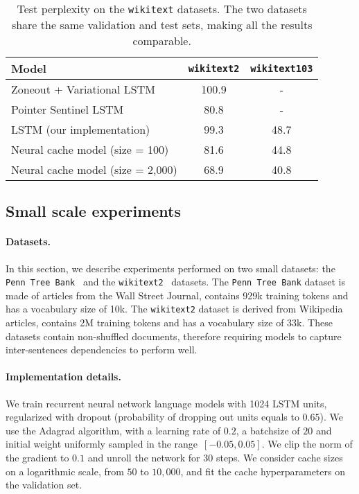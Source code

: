 \documentclass{article} \usepackage{iclr2017_conference,times}
\begin{document}
\begin{table}
  \small
  \centering
  \begin{tabular}{lcc}
    \toprule
    Model & \texttt{wikitext2} & \texttt{wikitext103} \\
    \midrule
    Zoneout + Variational LSTM~\citep{merity2016pointer}  & 100.9 & - \\
    Pointer Sentinel LSTM~\citep{merity2016pointer}       & 80.8  & - \\
    \midrule
    LSTM (our implementation)         & 99.3 & 48.7 \\
    Neural cache model (size = 100)   & 81.6 & 44.8 \\
    Neural cache model (size = 2,000) & 68.9 & 40.8 \\
    \bottomrule
  \end{tabular}
  \caption{Test perplexity on the \texttt{wikitext} datasets. The two datasets share the same validation and test sets, making all the results comparable.}
  \label{tab:wikitext}
\end{table}

\subsection{Small scale experiments}
\paragraph{Datasets.} In this section, we describe experiments performed on two small datasets: the \texttt{Penn Tree Bank}~\citep{marcus1993building} and the \texttt{wikitext2}~\citep{merity2016pointer} datasets.
The \texttt{Penn Tree Bank} dataset is made of articles from the Wall Street Journal, contains 929k training tokens and has a vocabulary size of 10k.
The \texttt{wikitext2} dataset is derived from Wikipedia articles, contains 2M training tokens and has a vocabulary size of 33k.
These datasets contain non-shuffled documents, therefore requiring models to capture inter-sentences dependencies to perform well.

\paragraph{Implementation details.} We train recurrent neural network language models with 1024 LSTM units, regularized with dropout (probability of dropping out units equals to $0.65$).
We use the Adagrad algorithm, with a learning rate of $0.2$, a batchsize of $20$ and initial weight uniformly sampled in the range~$[-0.05, 0.05]$.
We clip the norm of the gradient to $0.1$ and unroll the network for $30$ steps.
We consider cache sizes on a logarithmic scale, from $50$ to $10,000$, and fit the cache hyperparameters on the validation set.
\end{document}
